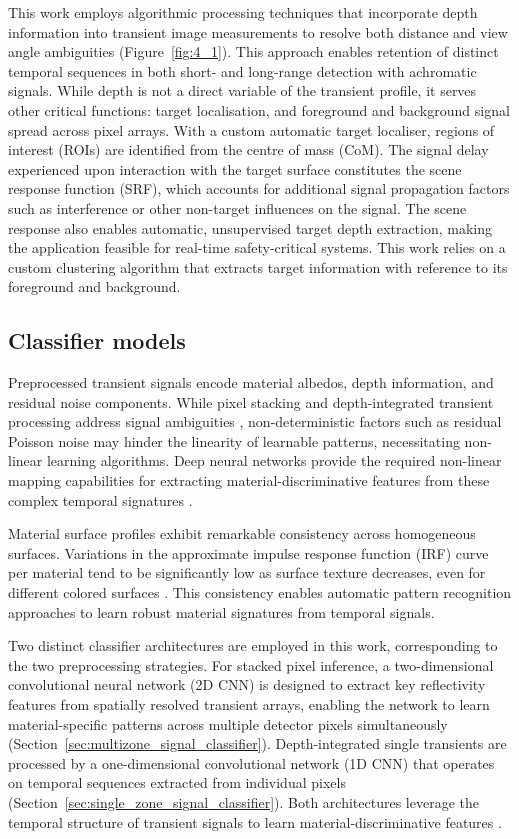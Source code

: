 \documentclass[12pt,a4paper,oneside]{report}
\begin{document}
This work employs algorithmic processing techniques that incorporate depth information into transient image measurements to resolve both distance and view angle ambiguities (Figure~\ref{fig:4_1}). This approach enables retention of distinct temporal sequences in both short- and long-range detection with achromatic signals. While depth is not a direct variable of the transient profile, it serves other critical functions: target localisation, and foreground and background signal spread across pixel arrays. With a custom automatic target localiser, regions of interest (ROIs) are identified from the centre of mass (CoM). The signal delay experienced upon interaction with the target surface constitutes the scene response function (SRF), which accounts for additional signal propagation factors such as interference or other non-target influences on the signal. The scene response also enables automatic, unsupervised target depth extraction, making the application feasible for real-time safety-critical systems. This work relies on a custom clustering algorithm that extracts target information with reference to its foreground and background.

\subsection{Classifier models}
\label{subsec:classifier_models_chapter_4}

Preprocessed transient signals encode material albedos, depth information, and residual noise components. While pixel stacking and depth-integrated transient processing address signal ambiguities \cite{jungerman2022,tontini2024}, non-deterministic factors such as residual Poisson noise may hinder the linearity of learnable patterns, necessitating non-linear learning algorithms. Deep neural networks provide the required non-linear mapping capabilities for extracting material-discriminative features from these complex temporal signatures \cite{lecun1998,su2016}.

Material surface profiles exhibit remarkable consistency across homogeneous surfaces. Variations in the approximate impulse response function (IRF) curve per material tend to be significantly low as surface texture decreases, even for different colored surfaces \cite{becker2023}. This consistency enables automatic pattern recognition approaches to learn robust material signatures from temporal signals.

Two distinct classifier architectures are employed in this work, corresponding to the two preprocessing strategies. For stacked pixel inference, a two-dimensional convolutional neural network (2D CNN) is designed to extract key reflectivity features from spatially resolved transient arrays, enabling the network to learn material-specific patterns across multiple detector pixels simultaneously (Section~\ref{sec:multizone_signal_classifier}). Depth-integrated single transients are processed by a one-dimensional convolutional network (1D CNN) that operates on temporal sequences extracted from individual pixels (Section~\ref{sec:single_zone_signal_classifier}). Both architectures leverage the temporal structure of transient signals to learn material-discriminative features \cite{su2016,becker2023}.
\end{document}
